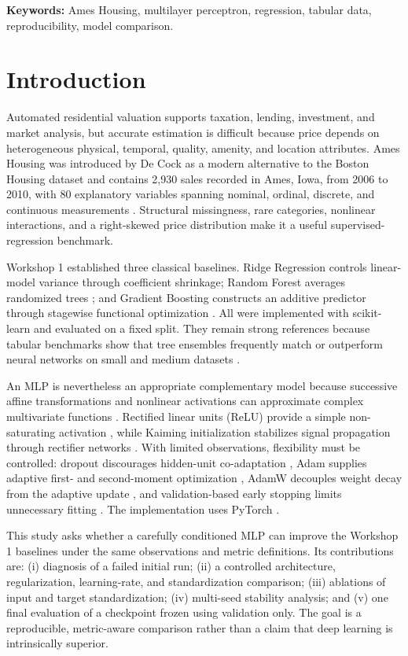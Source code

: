 \documentclass[11pt,a4paper]{article}
\begin{document}
\noindent\textbf{Keywords:} Ames Housing, multilayer perceptron, regression, tabular data, reproducibility, model comparison.

\section{Introduction}
Automated residential valuation supports taxation, lending, investment, and market analysis, but accurate estimation is difficult because price depends on heterogeneous physical, temporal, quality, amenity, and location attributes. Ames Housing was introduced by De Cock as a modern alternative to the Boston Housing dataset and contains 2,930 sales recorded in Ames, Iowa, from 2006 to 2010, with 80 explanatory variables spanning nominal, ordinal, discrete, and continuous measurements \cite{decock2011}. Structural missingness, rare categories, nonlinear interactions, and a right-skewed price distribution make it a useful supervised-regression benchmark.

Workshop 1 established three classical baselines. Ridge Regression controls linear-model variance through coefficient shrinkage; Random Forest averages randomized trees \cite{breiman2001}; and Gradient Boosting constructs an additive predictor through stagewise functional optimization \cite{friedman2001}. All were implemented with scikit-learn \cite{pedregosa2011} and evaluated on a fixed split. They remain strong references because tabular benchmarks show that tree ensembles frequently match or outperform neural networks on small and medium datasets \cite{gorishniy2021,grinsztajn2022}.

An MLP is nevertheless an appropriate complementary model because successive affine transformations and nonlinear activations can approximate complex multivariate functions \cite{hornik1989}. Rectified linear units (ReLU) provide a simple non-saturating activation \cite{nair2010}, while Kaiming initialization stabilizes signal propagation through rectifier networks \cite{he2015}. With limited observations, flexibility must be controlled: dropout discourages hidden-unit co-adaptation \cite{srivastava2014}, Adam supplies adaptive first- and second-moment optimization \cite{kingma2015}, AdamW decouples weight decay from the adaptive update \cite{loshchilov2019}, and validation-based early stopping limits unnecessary fitting \cite{prechelt1998}. The implementation uses PyTorch \cite{paszke2019}.

This study asks whether a carefully conditioned MLP can improve the Workshop 1 baselines under the same observations and metric definitions. Its contributions are: (i) diagnosis of a failed initial run; (ii) a controlled architecture, regularization, learning-rate, and standardization comparison; (iii) ablations of input and target standardization; (iv) multi-seed stability analysis; and (v) one final evaluation of a checkpoint frozen using validation only. The goal is a reproducible, metric-aware comparison rather than a claim that deep learning is intrinsically superior.
\end{document}
